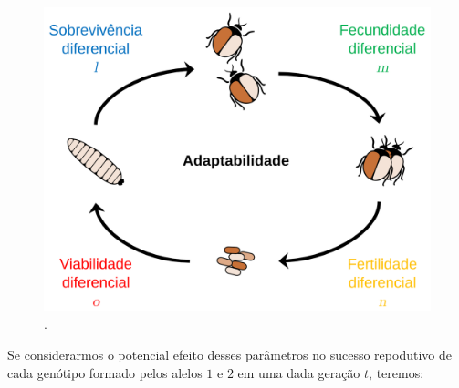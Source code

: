 \documentclass[
]{book}
\begin{document}
\begin{figure}

{\centering \includegraphics[width=600px]{figs/fitness_life_cylcle} 

}

\caption{.}\label{fig:bettlescycle}
\end{figure}

Se considerarmos o potencial efeito desses parâmetros no sucesso repodutivo de cada genótipo formado pelos alelos \(1\) e \(2\) em uma dada geração \(t\), teremos:
\end{document}

